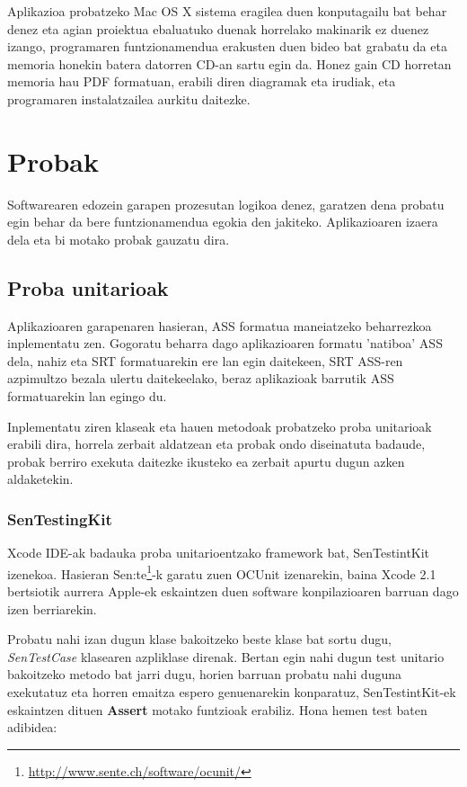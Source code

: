 Aplikazioa probatzeko Mac OS X sistema eragilea duen konputagailu bat behar denez eta agian proiektua ebaluatuko duenak horrelako makinarik ez duenez izango, programaren funtzionamendua erakusten duen bideo bat grabatu da eta memoria honekin batera datorren CD-an sartu egin da. Honez gain CD horretan memoria hau PDF formatuan, erabili diren diagramak eta irudiak, eta programaren instalatzailea aurkitu daitezke.

\section{Probak}
Softwarearen edozein garapen prozesutan logikoa denez, garatzen dena probatu egin behar da bere funtzionamendua egokia den jakiteko. Aplikazioaren izaera dela eta bi motako probak gauzatu dira.

\subsection{Proba unitarioak}
Aplikazioaren garapenaren hasieran, ASS formatua maneiatzeko beharrezkoa inplementatu zen. Gogoratu beharra dago aplikazioaren formatu 'natiboa' ASS dela, nahiz eta SRT formatuarekin ere lan egin daitekeen, SRT ASS-ren azpimultzo bezala ulertu daitekeelako, beraz aplikazioak barrutik ASS formatuarekin lan egingo du.

Inplementatu ziren klaseak eta hauen metodoak probatzeko proba unitarioak erabili dira, horrela zerbait aldatzean eta probak ondo diseinatuta badaude, probak berriro exekuta daitezke ikusteko ea zerbait apurtu dugun azken aldaketekin.

\subsubsection{SenTestingKit}
Xcode IDE-ak badauka proba unitarioentzako framework bat, SenTestintKit izenekoa. Hasieran Sen:te\footnote{\url{http://www.sente.ch/software/ocunit/}}-k garatu zuen OCUnit izenarekin, baina Xcode 2.1 bertsiotik aurrera Apple-ek eskaintzen duen software konpilazioaren barruan dago izen berriarekin.

Probatu nahi izan dugun klase bakoitzeko beste klase bat sortu dugu, \textit{SenTestCase} klasearen azpliklase direnak. Bertan egin nahi dugun test unitario bakoitzeko metodo bat jarri dugu, horien barruan probatu nahi duguna exekutatuz eta horren emaitza espero genuenarekin konparatuz, SenTestintKit-ek eskaintzen dituen \textbf{Assert} motako funtzioak erabiliz. Hona hemen test baten adibidea:


